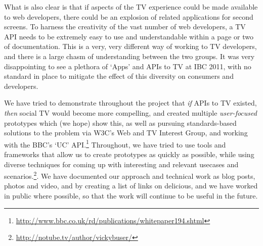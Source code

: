 \documentclass{notube}
\begin{document}
What is also clear is that if aspects of the TV experience could be made available to web developers, there could be an explosion of related applications for second screens. To harness the creativity of the vast number of web developers, a TV API needs to be extremely easy to use and understandable within a page or two of documentation. This is a very, very different way of working to TV developers, and there is a large chasm of understanding between the two groups. It was very disappointing to see a plethora of `Apps' and APIs to TV at IBC 2011, with no standard in place to mitigate the effect of this diversity on consumers and developers.

We have tried to demonstrate throughout the project that \emph{if} APIs to TV existed, \emph{then} social TV would become more compelling, and created multiple \emph{user-focused} prototypes which (we hope) show this, as well as pursuing standards-based solutions to the problem via W3C's Web and TV Interest Group, and working with the BBC's `UC' API.\footnote{\url{http://www.bbc.co.uk/rd/publications/whitepaper194.shtml}} Throughout, we have tried to use tools and frameworks that allow us to create prototypes as quickly as possible, while using diverse techniques for coming up with interesting and relevant usecases and scenarios.\footnote{\url{http://notube.tv/author/vickybuser/}}. We have documented our approach and technical work as blog posts, photos and video, and by creating a list of links on delicious, and we have worked in public where possible, so that the work will continue to be useful in the future.
\end{document}
